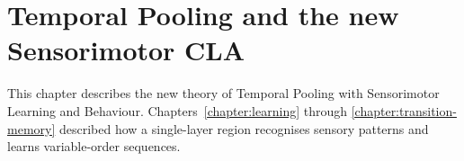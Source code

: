 \chapter{Temporal Pooling and the new Sensorimotor CLA}
\label{chapter:sensorimotor-cla}

This chapter describes the new theory of Temporal Pooling with Sensorimotor
Learning and Behaviour. Chapters~\ref{chapter:learning} through
\ref{chapter:transition-memory} described how a single-layer region recognises
sensory patterns and learns variable-order sequences.
